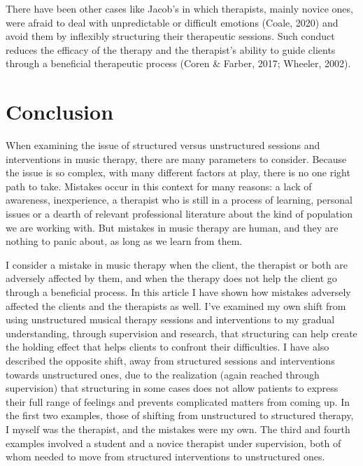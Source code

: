 \documentclass[authordate, empirical, issue]{jote-new-article}
\begin{document}
There have been other cases like Jacob's in which therapists, mainly novice ones, were afraid to deal with unpredictable or difficult emotions (Coale, 2020) and avoid them by inflexibly structuring their therapeutic sessions. Such conduct reduces the efficacy of the therapy and the therapist's ability to guide clients through a beneficial therapeutic process (Coren \& Farber, 2017; Wheeler, 2002).



\section{Conclusion}



When examining the issue of structured versus unstructured sessions and interventions in music therapy, there are many parameters to consider. Because the issue is so complex, with many different factors at play, there is no one right path to take. Mistakes occur in this context for many reasons: a lack of awareness, inexperience, a therapist who is still in a process of learning, personal issues or a dearth of relevant professional literature about the kind of population we are working with. But mistakes in music therapy are human, and they are nothing to panic about, as long as we learn from them.



I consider a mistake in music therapy when the client, the therapist or both are adversely affected by them, and when the therapy does not help the client go through a beneficial process. In this article I have shown how mistakes adversely affected the clients and the therapists as well. I've examined my own shift from using unstructured musical therapy sessions and interventions to my gradual understanding, through supervision and research, that structuring can help create the holding effect that helps clients to confront their difficulties. I have also described the opposite shift, away from structured sessions and interventions towards unstructured ones, due to the realization (again reached through supervision) that structuring in some cases does not allow patients to express their full range of feelings and prevents complicated matters from coming up. In the first two examples, those of shifting from unstructured to structured therapy, I myself was the therapist, and the mistakes were my own. The third and fourth examples involved a student and a novice therapist under supervision, both of whom needed to move from structured interventions to unstructured ones.
\end{document}
